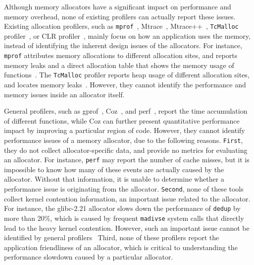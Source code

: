 Although memory allocators have a significant impact on performance and memory overhead, none of existing profilers can actually report these issues. Existing allocation profilers, such as \texttt{mprof}~\citep{Zorn:1988:MAP:894814}, Mtrace~\citep{mtrace}, Mtrace++~\citep{Lee:2000:DMM:786772.787150}, \texttt{TcMalloc} profiler~\citep{tcmalloc-profiler}, or CLR profiler~\citep{lupasc2014dynamic}, mainly focus on how an application uses the memory, instead of identifying the inherent design issues of the allocators. For instance, \texttt{mprof} attributes memory allocations to different allocation sites, and reports memory leaks and a direct allocation table that shows the memory usage of functions~\citep{Zorn:1988:MAP:894814}. The \texttt{TcMalloc} profiler reports heap usage of different allocation sites, and locates memory leaks~\citep{tcmalloc-profiler}. However, they cannot identify the performance and memory issues inside an allocator itself. 

General profilers, such as gprof~\citep{DBLP:conf/sigplan/GrahamKM82}, Coz~\citep{Coz}, and perf~\citep{perf}, report the time accumulation of different functions, while Coz can further present quantitative performance impact by improving a particular region of code. However, they cannot identify performance issues of a memory allocator, due to the following reasons. \texttt{First}, they do not collect allocator-specific data, and provide no metrics for evaluating an allocator. For instance, \texttt{perf} may report the number of cache misses, but it is impossible to know how many of these events are actually caused by the allocator. Without that information, it is unable to determine whether a performance issue is originating from the allocator. \texttt{Second}, none of these tools collect kernel contention information, an important issue related to the allocator. For instance, the glibc-2.21 allocator slows down the performance of \texttt{dedup} by more than 20\%, which is caused by frequent \texttt{madivse} system calls that directly lead to the heavy kernel contention. However, such an important issue cannot be identified by general profilers~\citep{DBLP:conf/sigplan/GrahamKM82, Coz, perf}%
Third, none of these profilers report the application friendliness of an allocator, which is critical to understanding the performance slowdown caused by a particular allocator.   

